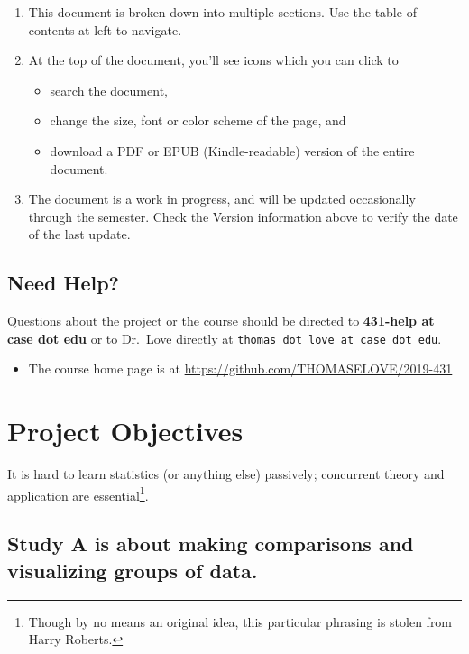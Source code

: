 \documentclass[]{book}
\providecommand{\tightlist}{%
  \setlength{\itemsep}{0pt}\setlength{\parskip}{0pt}}
\let\rmarkdownfootnote\footnote%
\def\footnote{\protect\rmarkdownfootnote}
\begin{document}
\begin{enumerate}
\def\labelenumi{\arabic{enumi}.}
\tightlist
\item
  This document is broken down into multiple sections. Use the table of contents at left to navigate.
\item
  At the top of the document, you'll see icons which you can click to

  \begin{itemize}
  \tightlist
  \item
    search the document,
  \item
    change the size, font or color scheme of the page, and
  \item
    download a PDF or EPUB (Kindle-readable) version of the entire document.
  \end{itemize}
\item
  The document is a work in progress, and will be updated occasionally through the semester. Check the Version information above to verify the date of the last update.
\end{enumerate}

\hypertarget{need-help}{%
\section*{Need Help?}\label{need-help}}

Questions about the project or the course should be directed to \textbf{431-help at case dot edu} or to Dr.~Love directly at \texttt{thomas\ dot\ love\ at\ case\ dot\ edu}.

\begin{itemize}
\tightlist
\item
  The course home page is at \url{https://github.com/THOMASELOVE/2019-431}
\end{itemize}

\hypertarget{project-objectives}{%
\chapter{Project Objectives}\label{project-objectives}}

It is hard to learn statistics (or anything else) passively; concurrent theory and application
are essential\footnote{Though by no means an original idea, this particular phrasing is stolen from Harry Roberts.}.

\hypertarget{study-a-is-about-making-comparisons-and-visualizing-groups-of-data.}{%
\section{Study A is about making comparisons and visualizing groups of data.}\label{study-a-is-about-making-comparisons-and-visualizing-groups-of-data.}}
\end{document}
